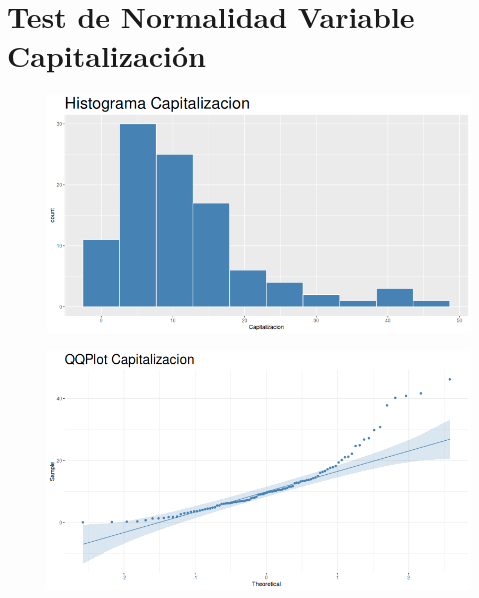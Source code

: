 \documentclass{article}
\begin{document}
    \section{Test de Normalidad Variable Capitalizaci\'on}

    \begin{center}
        \begin{minipage}{0.9\linewidth}
            \begin{minipage}{0.45\linewidth}
                \begin{figure}[H]
                    \includegraphics[width=\linewidth]{../hist2.png}
                \end{figure} 
            \end{minipage}
            \hspace{0.05\linewidth} 
            \begin{minipage}{0.45\linewidth}
                \begin{figure}[H]
                    \includegraphics[width=\linewidth]{../qqplot.png}
                \end{figure} 
            \end{minipage}
        \end{minipage}
    \end{center}
    
\end{document}
